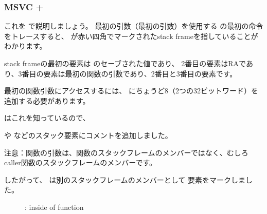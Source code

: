 \subsubsection{MSVC + \olly}
\myindex{\olly}
これを \olly で説明しましょう。 
最初の引数（最初の引数）を使用する \ttf の最初の命令をトレースすると、
\EBP が赤い四角でマークされた\gls{stack frame}を指していることがわかります。

\gls{stack frame}の最初の要素は \EBP のセーブされた値であり、
2番目の要素は\ac{RA}であり、3番目の要素は最初の関数の引数であり、2番目と3番目の要素です。

最初の関数引数にアクセスするには、 \EBP にちょうど8（2つの32ビットワード）を追加する必要があります。

\olly はこれを知っているので、 

や などのスタック要素にコメントを追加しました。

注意：関数の引数は、関数のスタックフレームのメンバーではなく、むしろ\gls{caller}関数のスタックフレームのメンバーです。

したがって、 \olly は別のスタックフレームのメンバーとして 要素をマークしました。

\begin{figure}[H]
\centering
{}
\caption{\olly: inside of \ttf{} function}
\label{fig:passing_arguments_olly}
\end{figure}

